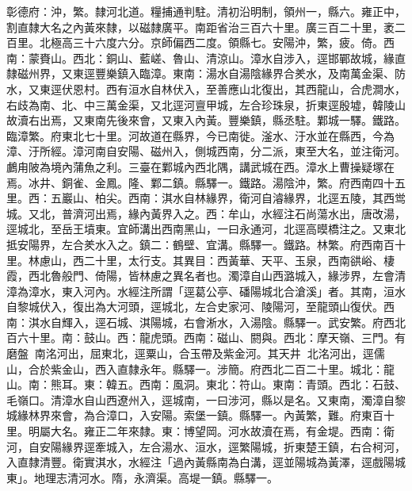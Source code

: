 \begin{pinyinscope}
彰德府：沖，繁。隸河北道。糧捕通判駐。清初沿明制，領州一，縣六。雍正中，割直隸大名之內黃來隸，以磁隸廣平。南距省治三百六十里。廣三百二十里，袤二百里。北極高三十六度六分。京師偏西二度。領縣七。安陽沖，繁，疲。倚。西南：蒙賚山。西北：銅山、藍嵯、魯山、清涼山。漳水自涉入，逕邯鄲故城，緣直隸磁州界，又東逕豐樂鎮入臨漳。東南：湯水自湯陰緣界合羑水，及南萬金渠、防水，又東逕伏恩村。西有洹水自林伏入，至善應山北復出，其西龍山，合虎澗水，右歧為南、北、中三萬金渠，又北逕河亶甲城，左合珍珠泉，折東逕殷墟，韓陵山故瀆右出焉，又東南先後來會，又東入內黃。豐樂鎮，縣丞駐。鄴城一驛。鐵路。臨漳繁。府東北七十里。河故道在縣界，今已南徙。滏水、汙水並在縣西，今為漳、汙所經。漳河南自安陽、磁州入，側城西南，分二派，東至大名，並注衛河。鸕甪陂為境內蒲魚之利。三臺在鄴城內西北隅，講武城在西。漳水上曹操疑塚在焉。冰井、銅雀、金鳳。隆、鄴二鎮。縣驛一。鐵路。湯陰沖，繁。府西南四十五里。西：五巖山、柏尖。西南：淇水自林緣界，衛河自濬緣界，北逕五陵，其西鸴城。又北，普濟河出焉，緣內黃界入之。西：牟山，水經注石尚蕩水出，唐改湯，逕城北，至岳王墳東。宜師溝出西南黑山，一曰永通河，北逕高暯橋注之。又東北抵安陽界，左合羑水入之。鎮二：鶴壁、宜溝。縣驛一。鐵路。林繁。府西南百十里。林慮山，西二十里，太行支。其異目：西黃華、天平、玉泉，西南谼峪、棲霞，西北魯般門、倚陽，皆林慮之異名者也。濁漳自山西潞城入，緣涉界，左會清漳為漳水，東入河內。水經注所謂「逕葛公亭、磻陽城北合滄溪」者。其南，洹水自黎城伏入，復出為大河頭，逕城北，左合史家河、陵陽河，至龍頭山復伏。西南：淇水自輝入，逕石城、淇陽城，右會淅水，入湯陰。縣驛一。武安繁。府西北百六十里。南：鼓山。西：龍虎頭。西南：磁山、閼與。西北：摩天嶺、三門。有磨盤，南洺河出，屈東北，逕粟山，合玉帶及紫金河。其天井，北洺河出，逕儒山，合於紫金山，西入直隸永年。縣驛一。涉簡。府西北二百二十里。城北：龍山。南：熊耳。東：韓五。西南：風洞。東北：符山。東南：青頭。西北：石鼓、毛嶺口。清漳水自山西遼州入，逕城南，一曰涉河，縣以是名。又東南，濁漳自黎城緣林界來會，為合漳口，入安陽。索堡一鎮。縣驛一。內黃繁，難。府東百十里。明屬大名。雍正二年來隸。東：博望岡。河水故瀆在焉，有金堤。西南：衛河，自安陽緣界逕牽城入，左合湯水、洹水，逕繁陽城，折東楚王鎮，右合柯河，入直隸清豐。衛實淇水，水經注「過內黃縣南為白溝，逕並陽城為黃澤，逕戲陽城東」。地理志清河水。隋，永濟渠。高堤一鎮。縣驛一。


\end{pinyinscope}
